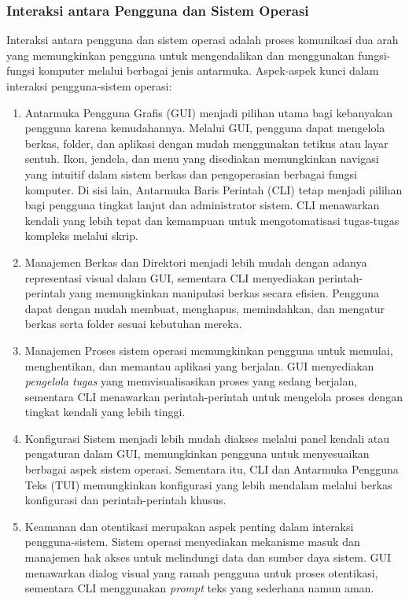\documentclass[12pt]{article}
\begin{document}
\subsubsection{Interaksi antara Pengguna dan Sistem Operasi}

Interaksi antara pengguna dan sistem operasi adalah proses komunikasi dua arah yang memungkinkan pengguna untuk mengendalikan dan menggunakan fungsi-fungsi komputer melalui berbagai jenis antarmuka. Aspek-aspek kunci dalam interaksi pengguna-sistem operasi:

\begin{enumerate}
\item Antarmuka Pengguna Grafis (GUI) menjadi pilihan utama bagi kebanyakan pengguna karena kemudahannya. Melalui GUI, pengguna dapat mengelola berkas, folder, dan aplikasi dengan mudah menggunakan tetikus atau layar sentuh. Ikon, jendela, dan menu yang disediakan memungkinkan navigasi yang intuitif dalam sistem berkas dan pengoperasian berbagai fungsi komputer. Di sisi lain, Antarmuka Baris Perintah (CLI) tetap menjadi pilihan bagi pengguna tingkat lanjut dan administrator sistem. CLI menawarkan kendali yang lebih tepat dan kemampuan untuk mengotomatisasi tugas-tugas kompleks melalui skrip.

\item {Manajemen Berkas dan Direktori} menjadi lebih mudah dengan adanya representasi visual dalam GUI, sementara CLI menyediakan perintah-perintah yang memungkinkan manipulasi berkas secara efisien. Pengguna dapat dengan mudah membuat, menghapus, memindahkan, dan mengatur berkas serta folder sesuai kebutuhan mereka.

\item {Manajemen Proses} sistem operasi memungkinkan pengguna untuk memulai, menghentikan, dan memantau aplikasi yang berjalan. GUI menyediakan \textit{pengelola tugas} yang memvisualisasikan proses yang sedang berjalan, sementara CLI menawarkan perintah-perintah untuk mengelola proses dengan tingkat kendali yang lebih tinggi.

\item {Konfigurasi Sistem} menjadi lebih mudah diakses melalui panel kendali atau pengaturan dalam GUI, memungkinkan pengguna untuk menyesuaikan berbagai aspek sistem operasi. Sementara itu, CLI dan Antarmuka Pengguna Teks (TUI) memungkinkan konfigurasi yang lebih mendalam melalui berkas konfigurasi dan perintah-perintah khusus.

\item {Keamanan dan otentikasi} merupakan aspek penting dalam interaksi pengguna-sistem. Sistem operasi menyediakan mekanisme masuk dan manajemen hak akses untuk melindungi data dan sumber daya sistem. GUI menawarkan dialog visual yang ramah pengguna untuk proses otentikasi, sementara CLI menggunakan \textit{prompt} teks yang sederhana namun aman.


\end{enumerate}
\end{document}
